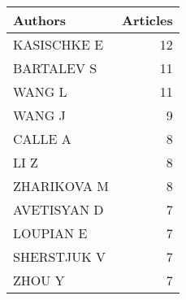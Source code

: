 
\begin{tabular}{lr}
\toprule
Authors & Articles\\
\midrule
KASISCHKE E & 12\\
BARTALEV S & 11\\
WANG L & 11\\
WANG J & 9\\
CALLE A & 8\\
\addlinespace
LI Z & 8\\
ZHARIKOVA M & 8\\
AVETISYAN D & 7\\
LOUPIAN E & 7\\
SHERSTJUK V & 7\\
\addlinespace
ZHOU Y & 7\\
\bottomrule
\end{tabular}